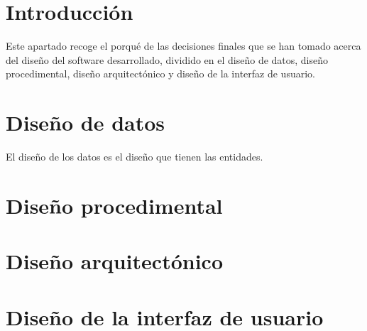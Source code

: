 \label{anex:C}

\section{Introducción}
Este apartado recoge el porqué de las decisiones finales que se han tomado acerca del diseño del software desarrollado, dividido en el diseño de datos, diseño procedimental, diseño arquitectónico y diseño de la interfaz de usuario.
\section{Diseño de datos}
El diseño de los datos es el diseño que tienen las entidades.
\section{Diseño procedimental}

\section{Diseño arquitectónico}

\section{Diseño de la interfaz de usuario}
